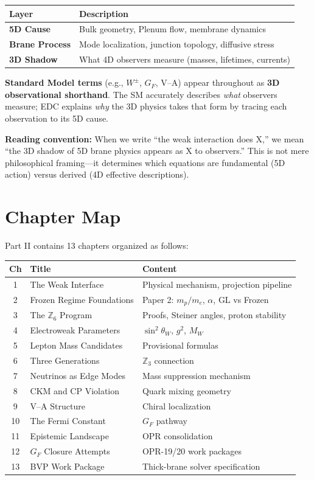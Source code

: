 \documentclass[11pt,a4paper]{book}
\theoremstyle{definition}
\theoremstyle{remark}
\begin{document}
\begin{center}
\begin{tabular}{@{}lp{10cm}@{}}
\toprule
\textbf{Layer} & \textbf{Description} \\
\midrule
\textbf{5D Cause} & Bulk geometry, Plenum flow, membrane dynamics \\
\textbf{Brane Process} & Mode localization, junction topology, diffusive stress \\
\textbf{3D Shadow} & What 4D observers measure (masses, lifetimes, currents) \\
\bottomrule
\end{tabular}
\end{center}

\textbf{Standard Model terms} (e.g., $W^\pm$, $G_F$, V--A) appear throughout as
\textbf{3D observational shorthand}. The SM accurately describes \emph{what}
observers measure; EDC explains \emph{why} the 3D physics takes that form by
tracing each observation to its 5D cause.

\textbf{Reading convention:} When we write ``the weak interaction does X,'' we
mean ``the 3D shadow of 5D brane physics appears as X to observers.'' This is
not mere philosophical framing---it determines which equations are fundamental
(5D action) versus derived (4D effective descriptions).

\section*{Chapter Map}

Part II contains 13 chapters organized as follows:

\begin{center}
\begin{tabular}{cll}
\toprule
\textbf{Ch} & \textbf{Title} & \textbf{Content} \\
\midrule
1 & The Weak Interface & Physical mechanism, projection pipeline \\
2 & Frozen Regime Foundations & Paper 2: $m_p/m_e$, $\alpha$, GL vs Frozen \\
3 & The $\mathbb{Z}_6$ Program & Proofs, Steiner angles, proton stability \\
4 & Electroweak Parameters & $\sin^2\theta_W$, $g^2$, $M_W$ \\
5 & Lepton Mass Candidates & Provisional formulas \\
6 & Three Generations & $\mathbb{Z}_3$ connection \\
7 & Neutrinos as Edge Modes & Mass suppression mechanism \\
8 & CKM and CP Violation & Quark mixing geometry \\
9 & V--A Structure & Chiral localization \\
10 & The Fermi Constant & $G_F$ pathway \\
11 & Epistemic Landscape & OPR consolidation \\
12 & $G_F$ Closure Attempts & OPR-19/20 work packages \\
13 & BVP Work Package & Thick-brane solver specification \\
\bottomrule
\end{tabular}
\end{center}
\end{document}
